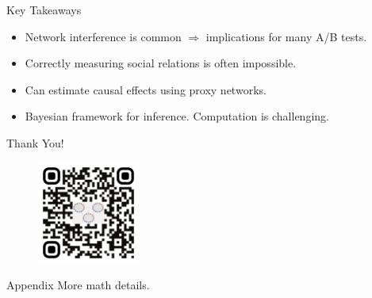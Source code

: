 \documentclass{beamer}
\begin{document}
    
    \begin{frame}{Key Takeaways}
        \large
        \begin{itemize}
            \item<1-> Network interference is common $\Rightarrow$ implications for many A/B tests.
            \vspace{0.3cm}
            \item<2-> Correctly measuring social relations is often impossible.
            \vspace{0.3cm}
            \item<2-> Can estimate causal effects using proxy networks.
            \vspace{0.3cm}
            \item<3-> Bayesian framework for inference. Computation is challenging.
        \end{itemize}
    \end{frame}

    
    \begin{frame}[focus]
        \Huge
        Thank You!
        \vspace{0.5cm}
        \begin{figure}[hbtp]
            \centering
            \includegraphics[width=0.3\textwidth]{figs/qr-code.png}
        \end{figure}
    \end{frame}
    
    \appendix
    
    \begin{frame}{Appendix}
        More math details.
    \end{frame}
\end{document}
